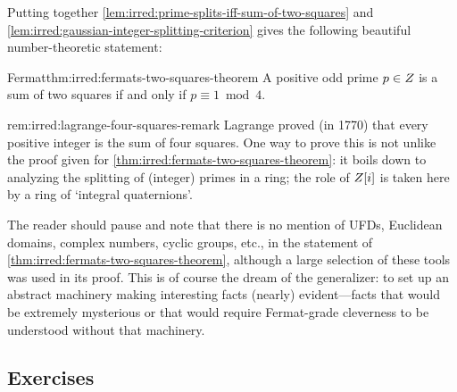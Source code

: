Putting together \cref{lem:irred:prime-splits-iff-sum-of-two-squares} and \cref{lem:irred:gaussian-integer-splitting-criterion} gives
the following beautiful number-theoretic statement:

\begin{thm}{Fermat}{thm:irred:fermats-two-squares-theorem}
  A positive odd prime $p \in Z$ is a sum of two squares if and only
  if $p \equiv 1 \bmod 4$.
\end{thm}
\begin{rem}{}{rem:irred:lagrange-four-squares-remark}
  Lagrange proved (in 1770) that every positive integer is the sum of
  four squares. One way to prove this is not unlike the proof given
  for \cref{thm:irred:fermats-two-squares-theorem}: it boils down to analyzing the splitting
  of (integer) primes in a ring; the role of $Z[i]$ is taken here by
  a ring of `integral quaternions'.
\end{rem}
The reader should pause and note that there is no mention of UFDs,
Euclidean domains, complex numbers, cyclic groups, etc., in the
statement of \cref{thm:irred:fermats-two-squares-theorem}, although a large selection of
these tools was used in its proof. This is of course the dream of the
generalizer: to set up an abstract machinery making interesting facts
(nearly) evident---facts that would be extremely mysterious or that
would require Fermat-grade cleverness to be understood without that
machinery.

\subsection*{Exercises}

